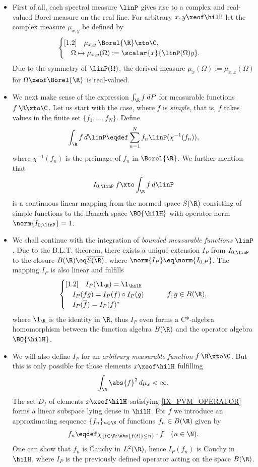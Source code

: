 \documentclass[11pt,twoside]{article}
\begin{document}
\begin{itemize}[leftmargin=12pt,itemsep=2mm]
\item[1.]
First of all,
each spectral measure $\linP$ gives rise
to a complex and real-valued Borel measure on the real line.
For arbitrary $x,y \xeof \hilH$
let the complex measure $\mu_{x,y}$ be defined by
\[
\begin{cases}[1.2]
\quad \mu_{x,y}\: \Borel{\R} \xto \C,\\
\quad \Omega \mapsto \mu_{x,y}(\Omega) := \scalar{x}{\linP(\Omega)y}.\\
\end{cases}
\]
Due to the symmetry of $\linP(\Omega)$,
the derived measure
$\mu_x(\Omega) := \mu_{x,x}(\Omega)$
for $\Omega \xeof \Borel{\R}$ is real-valued.

\item[2.]
We next make sense of the expression $\int_{\R} f \, dP$
for measurable functions $f\:\R \xto \C$.
Let us start with the case, where $f$ is \textit{simple},
that is,
$f$ takes values in the finite set $\{f_1,\ldots,f_N\}$.
Define
\[
\int_{\R} f \, d\linP \eqdef \sum_{n=1}^N f_n \linP(\chi^{-1}(f_n)),
\]
where $\chi^{-1}(f_n)$ is the preimage of $f_n$ in $\Borel{\R}$.
We further mention
that
\[
I_{0,\linP}\:f \xto \int_{\R} f \, d\linP
\]
is a continuous linear mapping from the normed space
$S(\R)$ consisting of simple functions
to the Banach space $\BO{\hilH}$ with operator norm $\norm{I_{0,\linP}}=1$.

\item[3.]
We shall continue with the integration
of \textit{bounded measurable functions} {\wrt} $\linP$.
Due to the B.L.T. theorem,
there exists a unique extension $I_P$ from $I_{0,\linP}$
to the closure $B(\R) \eq \overline{S(\R)}$,
where $\norm{I_P} \eq \norm{I_{0,P}}$.
The mapping $I_P$ is also linear and fulfills
\[
\begin{cases}[1.2]
\quad I_P(\1_{\R}) = \1_{\hilH}\\
\quad I_P(fg) = I_P(f) \circ I_P(g)\\
\quad I_P(\overline{f}) = I_P(f)^*\\
\end{cases}
\quad \quad f,g \in B(\R),
\]
where $\1_{\R}$ is the identity in $\R$,
thus $I_P$ even forms a C*-algebra homomorphism between
the function algebra $B(\R)$ and the operator algebra $\BO{\hilH}$.

\item[4.]
We will also define $I_P$
for an \textit{arbitrary measurable function} $f\:\R \xto \C$.
But this is only possible for those elements $x \xeof \hilH$ fulfilling
\begin{equation}\label{IX_PVM_OPERATOR}
\int_{\R} \abs{f} ^2 \, d \mu_x < \infty.
\end{equation}
The set $D_f$ of elements $x \xeof \hilH$ satisfying \eqref{IX_PVM_OPERATOR}
forms a linear subspace lying dense in $\hilH$.
For $f$ we introduce an approximating sequence $\{f_n\}_{n \in \N}$
of functions $f_n \in B(\R)$ given by
\[
f_n \eqdef \chi_{ \{t \in \R: \abs{f(t)} \leq n\}} \cdot f
\quad (n \in \N).
\]
One can show that $f_n$ is Cauchy in $L^2(\R)$,
hence $I_P(f_n)$ is Cauchy in $\hilH$,
where $I_P$ is the previously defined operator acting on the space $B(\R)$.


\end{itemize}
\end{document}
